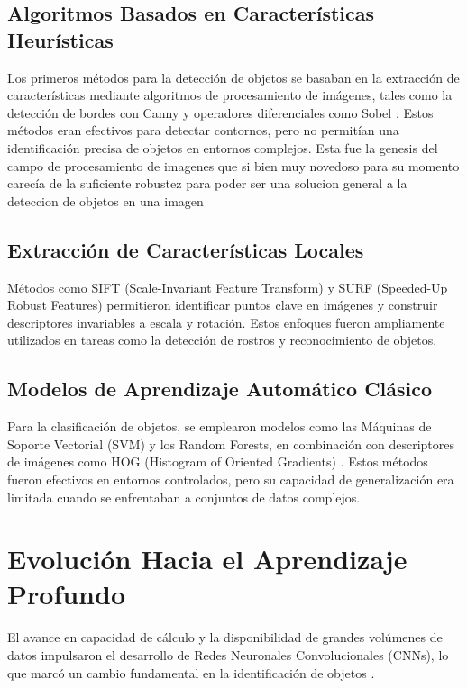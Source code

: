 \subsection{Algoritmos Basados en Características Heurísticas}

Los primeros métodos para la detección de objetos se basaban en la extracción de características mediante algoritmos de procesamiento de imágenes, tales como la detección de bordes con Canny y operadores diferenciales como Sobel \cite{Canny1986}. Estos métodos eran efectivos para detectar contornos, pero no permitían una identificación precisa de objetos en entornos complejos. Esta fue la genesis del campo de procesamiento de imagenes que si bien muy novedoso para su momento carecía de la suficiente robustez para poder ser una solucion general a la deteccion de objetos en una imagen 

\subsection{Extracción de Características Locales}

Métodos como SIFT (Scale-Invariant Feature Transform) \cite{Lowe2004}  y SURF (Speeded-Up Robust Features) \cite{Bay2008}  permitieron identificar puntos clave en imágenes y construir descriptores invariables a escala y rotación. Estos enfoques fueron ampliamente utilizados en tareas como la detección de rostros y reconocimiento de objetos.

\subsection{Modelos de Aprendizaje Automático Clásico}

Para la clasificación de objetos, se emplearon modelos como las Máquinas de Soporte Vectorial (SVM) y los Random Forests, en combinación con descriptores de imágenes como HOG (Histogram of Oriented Gradients) \cite{Dalal2005}. Estos métodos fueron efectivos en entornos controlados, pero su capacidad de generalización era limitada cuando se enfrentaban a conjuntos de datos complejos.

\section{Evolución Hacia el Aprendizaje Profundo}

El avance en capacidad de cálculo y la disponibilidad de grandes volúmenes de datos impulsaron el desarrollo de Redes Neuronales Convolucionales (CNNs), lo que marcó un cambio fundamental en la identificación de objetos \cite{Goodfellow2016}.

